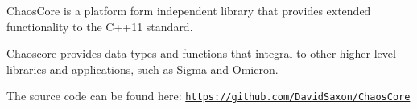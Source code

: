 Chaos\-Core is a platform form independent library that provides extended functionality to the C++11 standard.

Chaoscore provides data types and functions that integral to other higher level libraries and applications, such as Sigma and Omicron.

The source code can be found here\-: \href{https://github.com/DavidSaxon/ChaosCore}{\tt https\-://github.\-com/\-David\-Saxon/\-Chaos\-Core} 